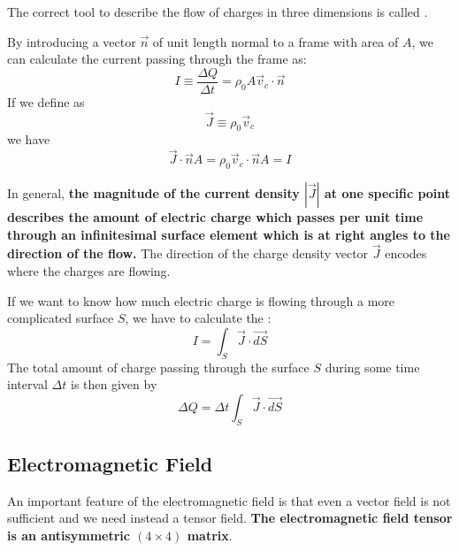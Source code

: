 The correct tool to describe the flow of charges in three dimensions is called \textbf{}. 
\begin{qt}
    By introducing a vector $\vec{n}$ of unit length normal to a frame with area of $A$, we can calculate the current passing through the frame as:
    \begin{equation}
I \equiv \frac{\Delta Q}{\Delta t}=\rho_{0} A \vec{v}_{c} \cdot \vec{n}
\end{equation}
If we define \textbf{} as 
\begin{equation}
\vec{J} \equiv \rho_{0} \vec{v}_{c}
\end{equation}
we have
\begin{equation}
\vec{J} \cdot \vec{n} A=\rho_{0} \vec{v}_{c} \cdot \vec{n} A=I
\end{equation}
\end{qt}
In general, \textbf{the magnitude of the current density $|\vec{J}|$ at one specific point describes the amount of electric charge which passes per unit time through an infinitesimal surface element which is at right angles to the direction of the flow.} The direction of the charge density vector $\vec{J}$ encodes where the charges are flowing.

\begin{qt}
    If we want to know how much electric charge is flowing through a more complicated surface $S$, we have to calculate the \textbf{}:
    \begin{equation}
I=\int_{S} \vec{J} \cdot \overrightarrow{d S}
\end{equation}
The total amount of charge passing through the surface $S$ during some time interval $\Delta t$ is then given by
\begin{equation}
\Delta Q=\Delta t \int_{S} \vec{J} \cdot \overrightarrow{d S}
\end{equation}
\end{qt}
\subsection{Electromagnetic Field}
An important feature of the electromagnetic field is that even a vector field is not sufficient and we need instead a tensor field. \textbf{The electromagnetic field tensor is an antisymmetric $(4 \times 4)$ matrix}. 

